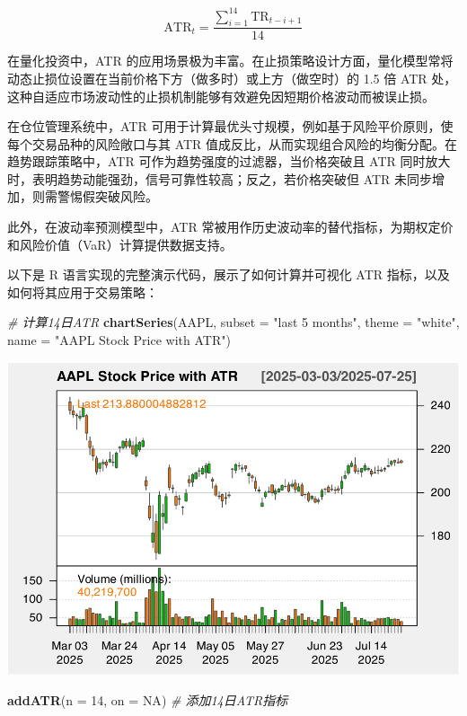 \documentclass[]{ctexbook}
\newenvironment{Shaded}{\begin{snugshade}}{\end{snugshade}}
\newcommand{\AttributeTok}[1]{\textcolor[rgb]{0.13,0.29,0.53}{#1}}
\newcommand{\CommentTok}[1]{\textcolor[rgb]{0.56,0.35,0.01}{\textit{#1}}}
\newcommand{\ConstantTok}[1]{\textcolor[rgb]{0.56,0.35,0.01}{#1}}
\newcommand{\DecValTok}[1]{\textcolor[rgb]{0.00,0.00,0.81}{#1}}
\newcommand{\FunctionTok}[1]{\textcolor[rgb]{0.13,0.29,0.53}{\textbf{#1}}}
\newcommand{\NormalTok}[1]{#1}
\newcommand{\StringTok}[1]{\textcolor[rgb]{0.31,0.60,0.02}{#1}}
\begin{document}
\[\text{ATR}_t = \frac{\sum_{i=1}^{14} \text{TR}_{t-i+1}}{14}\]

在量化投资中，ATR 的应用场景极为丰富。在止损策略设计方面，量化模型常将动态止损位设置在当前价格下方（做多时）或上方（做空时）的 1.5 倍 ATR 处，这种自适应市场波动性的止损机制能够有效避免因短期价格波动而被误止损。

在仓位管理系统中，ATR 可用于计算最优头寸规模，例如基于风险平价原则，使每个交易品种的风险敞口与其 ATR 值成反比，从而实现组合风险的均衡分配。在趋势跟踪策略中，ATR 可作为趋势强度的过滤器，当价格突破且 ATR 同时放大时，表明趋势动能强劲，信号可靠性较高；反之，若价格突破但 ATR 未同步增加，则需警惕假突破风险。

此外，在波动率预测模型中，ATR 常被用作历史波动率的替代指标，为期权定价和风险价值（VaR）计算提供数据支持。

以下是 R 语言实现的完整演示代码，展示了如何计算并可视化 ATR 指标，以及如何将其应用于交易策略：

\begin{Shaded}
\begin{Highlighting}[]
\CommentTok{\# 计算14日ATR}
\FunctionTok{chartSeries}\NormalTok{(AAPL, }\AttributeTok{subset =} \StringTok{"last 5 months"}\NormalTok{, }\AttributeTok{theme =} \StringTok{"white"}\NormalTok{, }
            \AttributeTok{name =} \StringTok{"AAPL Stock Price with ATR"}\NormalTok{)}
\end{Highlighting}
\end{Shaded}

\includegraphics[width=0.9\linewidth]{QuantmodHandbook_files/figure-latex/atr-1}

\begin{Shaded}
\begin{Highlighting}[]
\FunctionTok{addATR}\NormalTok{(}\AttributeTok{n =} \DecValTok{14}\NormalTok{, }\AttributeTok{on =} \ConstantTok{NA}\NormalTok{)  }\CommentTok{\# 添加14日ATR指标}
\end{Highlighting}
\end{Shaded}
\end{document}
